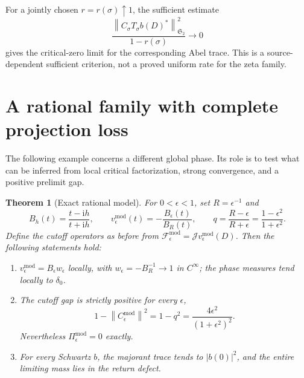\documentclass[11pt]{article}
\numberwithin{equation}{section}
\newtheorem{theorem}{Theorem}[section]
\theoremstyle{definition}
\theoremstyle{remark}
\newcommand{\ii}{\mathrm i}
\newcommand{\J}{\mathcal J}
\newcommand{\Fcal}{\mathcal F}
\newcommand{\Stwo}{\mathfrak S_2}
\newcommand{\norm}[1]{\left\lVert #1\right\rVert}
\begin{document}
For a jointly chosen \(r=r(\sigma)\uparrow1\), the sufficient
estimate
\[
\frac{\norm{C_\sigma T_\sigma b(D)^*}_{\Stwo}^2}
{1-r(\sigma)}\longrightarrow0
\]
gives the critical-zero limit for the corresponding Abel trace.
This is a source-dependent sufficient criterion, not a proved
uniform rate for the zeta family.

\section{A rational family with complete projection loss}\label{sec:model}

The following example concerns a different global phase. Its role
is to test what can be inferred from local critical factorization,
strong convergence, and a positive prelimit gap.

\begin{theorem}[Exact rational model]\label{thm:model}
For \(0<\epsilon<1\), set \(R=\epsilon^{-1}\) and
\begin{equation}\label{eq:model-phase}
B_h(t)=\frac{t-\ii h}{t+\ii h},\qquad
v_\epsilon^{\mathrm{mod}}(t)=-\frac{B_\epsilon(t)}{B_R(t)},
\qquad
q=\frac{R-\epsilon}{R+\epsilon}
=\frac{1-\epsilon^2}{1+\epsilon^2}.
\end{equation}
Define the cutoff operators as before from
\(\Fcal_\epsilon^{\mathrm{mod}}=\J v_\epsilon^{\mathrm{mod}}(D)\).
Then the following statements hold:
\begin{enumerate}
\item \(v_\epsilon^{\mathrm{mod}}=B_\epsilon w_\epsilon\)
locally, with \(w_\epsilon=-B_R^{-1}\to1\) in \(C^\infty\);
the phase measures tend locally to \(\delta_0\).
\item The cutoff gap is strictly positive for every \(\epsilon\),
\[
1-\norm{C_\epsilon^{\mathrm{mod}}}^2
=1-q^2=\frac{4\epsilon^2}{(1+\epsilon^2)^2}.
\]
Nevertheless \(\Pi_\epsilon^{\mathrm{mod}}=0\) exactly.
\item For every Schwartz \(b\), the majorant trace tends to
\(|b(0)|^2\), and the entire limiting mass lies in the return defect.
\end{enumerate}
\end{theorem}
\end{document}
